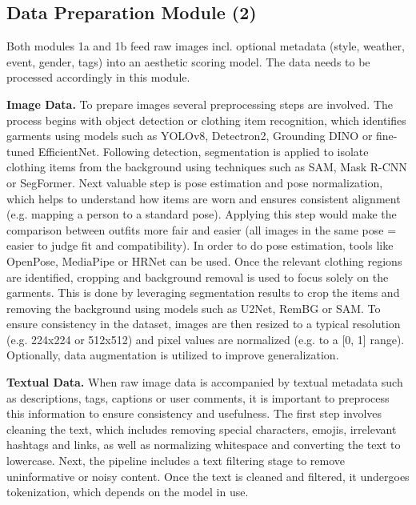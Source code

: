 \subsection{Data Preparation Module (2)}

Both modules 1a and 1b feed raw images incl. optional metadata (style, weather, event, gender, tags) into an aesthetic scoring model. The data needs to be processed accordingly in this module.

\vspace{0.5cm}

\textbf{Image Data.}
To prepare images several preprocessing steps are involved. The process begins with object detection or clothing item recognition, which identifies garments using models such as YOLOv8, Detectron2, Grounding DINO or fine-tuned EfficientNet. Following detection, segmentation is applied to isolate clothing items from the background using techniques such as \acs{SAM}, Mask R-CNN or SegFormer. Next valuable step is pose estimation and pose normalization, which helps to understand how items are worn and ensures consistent alignment (e.g. mapping a person to a standard pose). Applying this step would make the comparison between outfits more fair and easier (all images in the same pose = easier to judge fit and compatibility). In order to do pose estimation, tools like OpenPose, MediaPipe or HRNet can be used. Once the relevant clothing regions are identified, cropping and background removal is used to focus solely on the garments. This is done by leveraging segmentation results to crop the items and removing the background using models such as U2Net, RemBG or \acs{SAM}. To ensure consistency in the dataset, images are then resized to a typical resolution (e.g. 224x224 or 512x512) and pixel values are normalized (e.g. to a [0, 1] range). Optionally, data augmentation is utilized to improve generalization.

\vspace{0.5cm}

\textbf{Textual Data.}
When raw image data is accompanied by textual metadata such as descriptions, tags, captions or user comments, it is important to preprocess this information to ensure consistency and usefulness. The first step involves cleaning the text, which includes removing special characters, emojis, irrelevant hashtags and links, as well as normalizing whitespace and converting the text to lowercase. Next, the pipeline includes a text filtering stage to remove uninformative or noisy content. Once the text is cleaned and filtered, it undergoes tokenization, which depends on the model in use.

